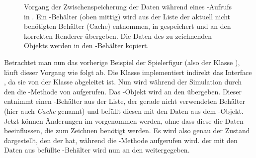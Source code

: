 \begin{figure}
	\centering
		\caption[Vorgang der Zwischenspeicherung der Daten während eines -Aufrufs in .]{Vorgang der Zwischenspeicherung der Daten während eines -Aufrufs in . Ein -Behälter (oben mittig) wird aus der Liste der aktuell nicht benötigten Behälter (Cache) entnommen, in  gespeichert und an den korrekten Renderer übergeben. Die Daten des zu zeichnenden Objekts werden in den -Behälter kopiert.}\label{fig:copyRenderable}
\end{figure}


Betrachtet man nun das vorherige Beispiel der Spielerfigur (also der Klasse ), läuft dieser Vorgang wie folgt ab. Die Klasse  implementiert indirekt das Interface , da sie von der Klasse  abgeleitet ist. Nun wird während der Simulation durch den  die -Methode von  aufgerufen. Das -Objekt wird an den  übergeben. Dieser entnimmt einen -Behälter aus der Liste, der gerade nicht verwendeten Behälter (hier auch \emph{Cache} genannt) und befüllt diesen mit den Daten aus dem -Objekt. Jetzt können Änderungen im  vorgenommen werden, ohne dass diese die Daten beeinflussen, die zum Zeichnen benötigt werden. Es wird also genau der Zustand dargestellt, den der  hat, während die -Methode aufgerufen wird. der mit den Daten aus  befüllte -Behälter wird nun an den  weitergegeben.



